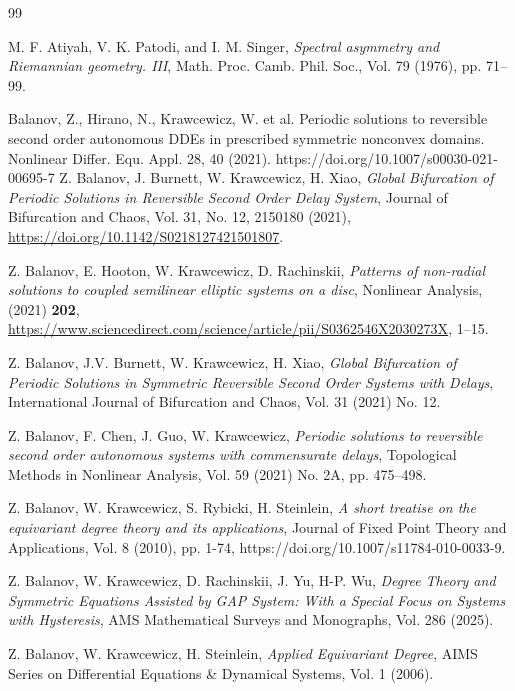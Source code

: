\documentclass[twoside]{article}%
\begin{document}
\newpage
\begin{thebibliography}{99}
\normalsize
\baselineskip=17pt

M. F. Atiyah, V. K. Patodi, and I. M. Singer, \emph{Spectral asymmetry and Riemannian geometry. III}, Math. Proc. Camb. Phil. Soc., Vol. 79 (1976), pp. 71--99.

 Balanov, Z., Hirano, N., Krawcewicz, W. et al. Periodic solutions to reversible second order autonomous DDEs in prescribed symmetric nonconvex domains. Nonlinear Differ. Equ. Appl. 28, 40 (2021). https://doi.org/10.1007/s00030-021-00695-7
  Z. Balanov, J. Burnett, W. Krawcewicz, H. Xiao, {\it  Global Bifurcation of Periodic Solutions in Reversible Second Order Delay System}, {Journal of Bifurcation and Chaos},
 Vol. 31, No. 12, 2150180 (2021), \url{https://doi.org/10.1142/S0218127421501807}.
    
 Z. Balanov, E. Hooton, W. Krawcewicz, D. Rachinskii, {\it  Patterns of non-radial solutions to coupled semilinear elliptic systems on a disc}, Nonlinear Analysis, (2021) {\bf 202}, \url{https://www.sciencedirect.com/science/article/pii/S0362546X2030273X}, 1--15.

 Z. Balanov,  J.V. Burnett, W. Krawcewicz, H. Xiao,  {\it Global Bifurcation of Periodic Solutions in Symmetric Reversible Second Order Systems with Delays}, International Journal of Bifurcation and Chaos, Vol. 31 (2021) No. 12.

Z. Balanov, F. Chen, J. Guo,  W. Krawcewicz,  {\it Periodic solutions to reversible second order autonomous systems with commensurate delays}, Topological Methods in Nonlinear Analysis, Vol. 59 (2021) No. 2A, pp. 475–498.

  Z. Balanov, W. Krawcewicz,   S. Rybicki, H. Steinlein,  {\it A short treatise on the equivariant degree theory and its applications}, Journal of Fixed Point Theory and Applications, Vol. 8 (2010), pp. 1-74, https://doi.org/10.1007/s11784-010-0033-9.

 Z. Balanov, W. Krawcewicz,  D. Rachinskii, J. Yu, H-P. Wu, {\it Degree Theory and Symmetric Equations Assisted by GAP System: With a Special Focus on Systems with Hysteresis}, AMS Mathematical Surveys and Monographs, Vol. 286 (2025).

 Z. Balanov, W. Krawcewicz, H. Steinlein, {\it Applied Equivariant Degree}, AIMS Series on Differential Equations \& Dynamical Systems, Vol. 1 (2006).


\end{thebibliography}
\end{document}
